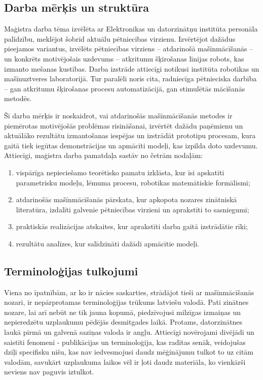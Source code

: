\documentclass[12pt, a4paper]{article}
\numberwithin{equation}{section} %
\begin{document}
\subsection*{Darba mērķis un struktūra} %

Maģistra darba tēma izvēlēta ar Elektronikas un datorzinātņu institūta personāla palīdzību, meklējot šobrīd aktuālu pētniecības virzienu. Izvērtējot dažādus pieejamos variantus, izvēlēts pētniecības virziens -- atdarinošā mašīnmācīšanās -- un konkrēts motivējošais uzdevums -- atkritumu šķirošanas līnijas robots, kas izmanto mešanas kustības. Darba izstrāde attiecīgi notikusi institūta robotikas un mašīnuztveres laboratorijā. Tur paralēli noris cita, radniecīga pētnieciska darbība -- gan atkritumu šķirošanas procesu automatizācijā, gan stimulētās mācīšanās metodēs. 

Šī darba mērķis ir noskaidrot, vai atdarinošās mašīnmācīšanās metodes ir piemērotas motivējošās problēmas risināšanai, izvērtēt dažādu paņēmienu un aktuālāko rezultātu izmantošanas iespējas un izstrādāt prototipu procesam, kura gaitā tiek iegūtas demonstrācijas un apmācīti modeļi, kas izpilda doto uzdevumu. Attiecīgi, maģistra darba pamatdaļa sastāv no četrām nodaļām:
\begin{enumerate}
    \item vispārīga nepieciešamo teorētisko pamatu izklāsta, kur īsi apskatīti parametrisku modeļu, lēmuma procesu, robotikas matemātiskie formālismi;
    \item atdarinošās mašīnmācīšanās pārskata, kur apkopota nozares zinātniskā literatūra, izdalīti galvenie pētniecības virzieni un aprakstīti to sasniegumi;
    \item praktiskās realizācijas atskaites, kur aprakstīti darba gaitā izstrādātie rīki;
    \item rezultātu analīzes, kur salīdzināti dažādi apmācītie modeļi.
\end{enumerate}


\subsection*{Terminoloģijas tulkojumi} %

Viena no īpatnībām, ar ko ir nācies saskarties, strādājot tieši ar mašīnmācīšanās nozari, ir nepārprotamas terminoloģijas trūkums latviešu valodā. Pati zinātnes nozare, lai arī nebūt ne tik jauna kopumā, piedzīvojusi milzīgas izmaiņas un nepieredzētu uzplaukumu pēdējās desmitgades laikā. Protams, datorzinātnes laukā pirmā un galvenā saziņas valoda ir angļu. Attiecīgi novērojami divējādi un saistīti fenomeni - publikācijas un terminoloģija, kas radītas senāk, veidojušas dziļi specifisku nišu, kas nav iedvesmojusi daudz mēģinājumu tulkot to uz citām valodām, savukārt uzplaukuma laikos vēl ir ļoti daudz materiāla, ko vienkārši neviens nav paguvis iztulkot.
\end{document}
